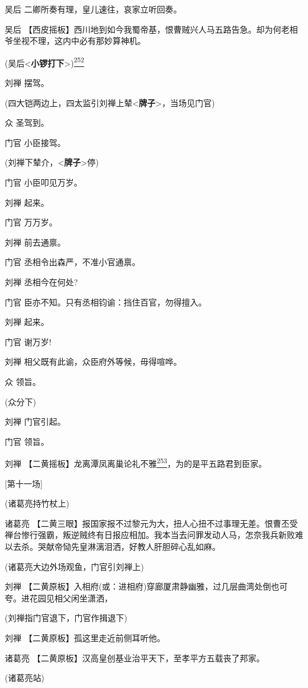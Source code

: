 吴后 二卿所奏有理，皇儿速往，哀家立听回奏。

吴后
【西皮摇板】西川地到如今我蜀帝基，恨曹贼兴人马五路告急。却为何老相爷坐视不理，这内中必有那妙算神机。

(吴后\textless{}\textbf{小锣打下}\textgreater{})\protect\hyperlink{fn252}{\textsuperscript{252}}

刘禅 摆驾。

(四大铠两边上，四太监引刘禅上辇\textless{}\textbf{牌子}\textgreater{}，当场见门官)

众 圣驾到。

门官 小臣接驾。

(刘禅下辇介，\textless{}\textbf{牌子}\textgreater{}停)

门官 小臣叩见万岁。

刘禅 起来。

门官 万万岁。

刘禅 前去通禀。

门官 丞相令出森严，不准小官通禀。

刘禅 丞相今在何处?

门官 臣亦不知。只有丞相钧谕：挡住百官，勿得擅入。

刘禅 起来。

门官 谢万岁!

刘禅 相父既有此谕，众臣府外等候，毋得喧哗。

众 领旨。

(众分下)

刘禅 门官引起。

门官 领旨。

刘禅
【二黄摇板】龙离潭凤离巢论礼不雅\protect\hyperlink{fn253}{\textsuperscript{253}}，为的是平五路君到臣家。

{[}第十一场{]}

(诸葛亮持竹杖上)

诸葛亮
【二黄三眼】报国家报不过黎元为大，扭人心扭不过事理无差。恨曹丕受禅台惨行强霸，叛逆贼终有日报应相加。我本当去问罪发动人马，怎奈我兵新败难以去杀。哭献帝恸先皇淋漓泪洒，好教人肝胆碎心乱如麻。

(诸葛亮大边外场观鱼，门官引刘禅上)

刘禅
【二黄原板】入相府(或：进相府)穿廊厦肃静幽雅，过几层曲湾处倒也可夸。进花园见相父闲坐潇洒，

(刘禅指门官退下，门官作揖退下)

刘禅 【二黄原板】孤这里走近前侧耳听他。

诸葛亮 【二黄原板】汉高皇创基业治平天下，至孝平方五载丧了邦家。

(诸葛亮站)


